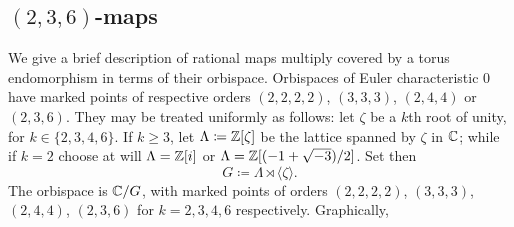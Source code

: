 \documentclass{amsart}
\begin{document}
\subsection{\myboldmath $(2,3,6)$-maps}
We give a brief description of rational maps multiply covered by a torus
endomorphism in terms of their orbispace. Orbispaces of Euler
characteristic $0$ have marked points of respective orders
$(2,2,2,2)$, $(3,3,3)$, $(2,4,4)$ or $(2,3,6)$. They may be treated
uniformly as follows: let $\zeta$ be a $k$th root of unity, for
$k\in\{2,3,4,6\}$. If $k\ge3$, let $\Lambda\coloneqq{\mathbb Z}[\zeta]$ be the
lattice spanned by $\zeta$ in ${\mathbb C}$; while if $k=2$ choose at will
$\Lambda={\mathbb Z}[i]$ or $\Lambda={\mathbb Z}[(-1+\sqrt{-3})/2]$. Set then
\[G\coloneqq\Lambda\rtimes\langle\zeta\rangle.\] The orbispace is
${\mathbb C}/G$, with marked points of orders $(2,2,2,2)$, $(3,3,3)$,
$(2,4,4)$, $(2,3,6)$ for $k=2,3,4,6$ respectively. Graphically,
\end{document}
